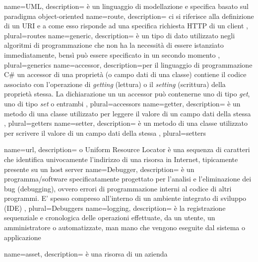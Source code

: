  {
	name=UML,
	description={ è un linguaggio di modellazione e specifica basato sul paradigma object-oriented
	}
}
 {
	name=route,
	description={ ci si riferisce alla definizione di un URI e a come esso risponde ad una specifica richiesta HTTP di un client
	},
	plural=routes
}
 {
	name=generic,
	description={ è un tipo di dato utilizzato negli algoritmi di programmazione che non ha la necessità di essere istanziato immediatamente, bensì può essere specificato in un secondo momento
	},
	plural=generics
}
 {
	name=accessor,
	description={per il linguaggio di programmazione C\# un accessor di una proprietà (o campo dati di una classe) contiene il codice associato con l'operazione di \textit{getting} (lettura) o il \textit{setting} (scrittura) della proprietà stessa. La dichiarazione un un accessor può contenerne uno di tipo \textit{get}, uno di tipo \textit{set} o entrambi
	},
	plural=accessors
}
 {
	name=getter,
	description={ è un metodo di una classe utilizzato per leggere il valore di un campo dati della stessa
	},
	plural=getters
}
 {
	name=setter,
	description={ è un metodo di una classe utilizzato per scrivere il valore di un campo dati della stessa
	},
	plural=setters
}

 {
	name=url,
	description={ o Uniform Resource Locator è una sequenza di caratteri che identifica univocamente l'indirizzo di una risorsa in Internet, tipicamente presente su un host server
	}
}
 {
	name=Debugger,
	description={ è un programma/software specificatamente progettato per l'analisi e l'eliminazione dei bug (debugging), ovvero errori di programmazione interni al codice di altri programmi. E' spesso compreso all'interno di un ambiente integrato di sviluppo (IDE)
	},
	plural=Debuggers
}
 {
	name=logging,
	description={ è la registrazione sequenziale e cronologica delle operazioni effettuate, da un utente, un amministratore o automatizzate, man mano che vengono eseguite dal sistema o applicazione
	}
}

 {
	name=asset,
	description={ è una risorsa di un azienda
	}
}





